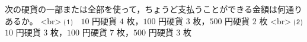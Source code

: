 次の硬貨の一部または全部を使って，ちょうど支払うことができる金額は何通りあるか。 <br>
⑴　$10$ 円硬貨 $4$ 枚，$100$ 円硬貨 $3$ 枚，$500$ 円硬貨 $2$ 枚 <br>
⑵　$10$ 円硬貨 $3$ 枚，$100$ 円硬貨 $7$ 枚，$500$ 円硬貨 $3$ 枚

